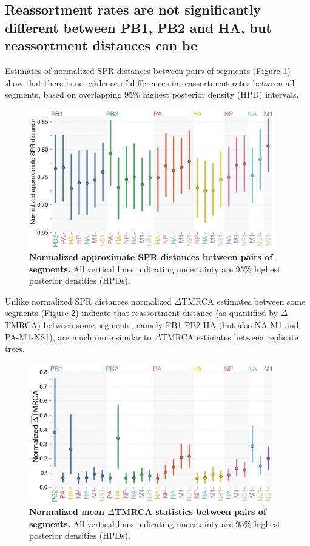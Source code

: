 \documentclass[11pt,oneside,letterpaper]{article}
\begin{document}
\subsection*{Reassortment rates are not significantly different between PB1, PB2 and HA, but reassortment distances can be}
Estimates of normalized SPR distances between pairs of segments (Figure \ref{SPRdistances}) show that there is no evidence of differences in reassortment rates between all segments, based on overlapping 95\% highest posterior density (HPD) intervals.


\begin{figure}
	\centering		
	\includegraphics[width=0.95\textwidth]{figures/InfB_normalizedApproxSPR.png}
	\caption{\textbf{Normalized approximate SPR distances between pairs of segments.}
All vertical lines indicating uncertainty are 95\% highest posterior densities (HPDs).}
	\label{SPRdistances}
\end{figure}

Unlike normalized SPR distances normalized $\Delta$TMRCA estimates between some segments (Figure \ref{deltaTMRCA}) indicate that reassortment distance (as quantified by $\Delta$TMRCA) between some segments, namely PB1-PB2-HA (but also NA-M1 and PA-M1-NS1), are much more similar to $\Delta$TMRCA estimates between replicate trees.

\begin{figure}
	\centering		
	\includegraphics[width=0.95\textwidth]{figures/InfB_normalizedMuDeltaTMRCA.png}
	\caption{\textbf{Normalized mean $\Delta$TMRCA statistics between pairs of segments.}
All vertical lines indicating uncertainty are 95\% highest posterior densities (HPDs).}
	\label{deltaTMRCA}
\end{figure}
\end{document}
